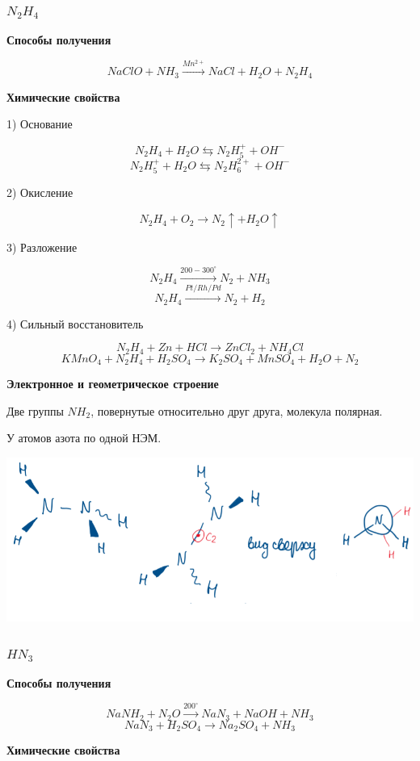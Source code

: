\documentclass[14pt,a4paper]{scrartcl}
\begin{document}
\subsubsection{$N_2H_4$}

\textbf{Способы получения}

$$NaClO + NH_3 \xrightarrow{Mn^{2+}} NaCl + H_2O + N_2H_4$$

\textbf{Химические свойства}

1) Основание

$$N_2H_4 + H_2O \leftrightarrows N_2H_5^+ + OH^-$$
$$N_2H_5^+ + H_2O \leftrightarrows N_2H_6^{2+} + OH^-$$

2) Окисление

$$N_2H_4 + O_2 \rightarrow N_2\uparrow + H_2O \uparrow$$

3) Разложение

$$N_2H_4 \xrightarrow{200-300^{\circ}} N_2 + NH_3$$
$$N_2H_4 \xrightarrow{Pt/Rh/Pd} N_2 + H_2$$

4) Сильный восстановитель

$$N_2H_4 + Zn + HCl \rightarrow ZnCl_2 + NH_4Cl$$
$$KMnO_4 + N_2H_4 + H_2SO_4 \rightarrow K_2SO_4 + MnSO_4 + H_2O + N_2$$

\textbf{Электронное и геометрическое строение}

Две группы $NH_2$, повернутые относительно друг друга, молекула полярная.

У атомов азота по одной НЭМ.

\includegraphics{8v4.png}

\subsubsection{$HN_3$}

\textbf{Способы получения}

$$NaNH_2 + N_2O \xrightarrow{200^{\circ}} NaN_3 + NaOH + NH_3$$
$$NaN_3 + H_2SO_4 \rightarrow Na_2SO_4 + NH_3$$

\textbf{Химические свойства}
\end{document}
